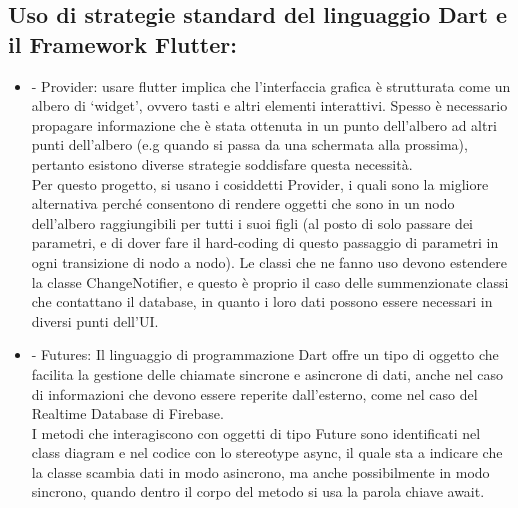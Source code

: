 \documentclass{article}
\begin{document}
\subsection{Uso di strategie standard del linguaggio Dart e il Framework Flutter:}
\begin{itemize}
    \item -	Provider: usare flutter implica che l’interfaccia grafica è strutturata come un albero di ‘widget’, ovvero tasti e altri elementi interattivi. Spesso è necessario propagare informazione che è stata ottenuta in un punto dell’albero ad altri punti dell’albero (e.g quando si passa da una schermata alla prossima), pertanto esistono diverse strategie soddisfare questa necessità. 
    \\Per questo progetto, si usano i cosiddetti Provider, i quali sono la migliore alternativa perché consentono di rendere oggetti che sono in un nodo dell’albero raggiungibili per tutti i suoi figli (al posto di solo passare dei parametri, e di dover fare il hard-coding di questo passaggio di parametri in ogni transizione di nodo a nodo). Le classi che ne fanno uso devono estendere la classe ChangeNotifier, e questo è proprio il caso delle summenzionate classi che contattano il database, in quanto i loro dati possono essere necessari in diversi punti dell’UI.
    \item -	Futures: Il linguaggio di programmazione Dart offre un tipo di oggetto che facilita la gestione delle chiamate sincrone e asincrone di dati, anche nel caso di informazioni che devono essere reperite dall’esterno, come nel caso del Realtime Database di Firebase. 
\\I metodi che interagiscono con oggetti di tipo Future sono identificati nel class diagram e nel codice con lo stereotype async, il quale sta a indicare che la classe scambia dati in modo asincrono, ma anche possibilmente in modo sincrono, quando dentro il corpo del metodo si usa la parola chiave await.
\end{itemize} 
\end{document}
